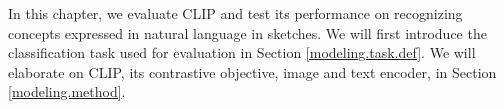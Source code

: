 In this chapter, we evaluate CLIP and test its performance on recognizing concepts expressed in natural language in sketches. We will first introduce the classification task used for evaluation in Section \ref{modeling.task.def}. We will elaborate on CLIP, its contrastive objective, image and text encoder, in Section \ref{modeling.method}.




